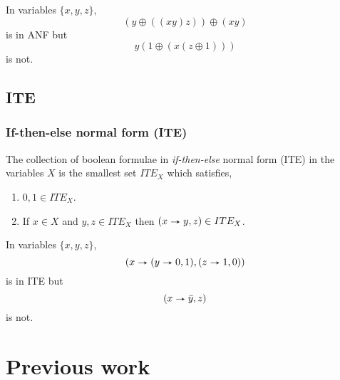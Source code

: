 \documentclass{beamer}
\newcommand{\ite}[3]{(#1 ~\tikz[baseline] \draw[->, -stealth] (0ex,.5ex)--(2ex,.5ex);~ #2 , #3)}
\begin{document}
\begin{frame}
\begin{example}
In variables $\{x,y,z\}$,
$$(y \oplus ((x y) z)) \oplus (x y)$$
is in ANF but 
$$y(1 \oplus (x(z \oplus 1)))$$
is not.
\end{example}
\end{frame}

\subsection[ITE]{ITE}
\begin{frame}
\frametitle{If-then-else normal form (ITE)}
The collection of boolean formulae in \textit{if-then-else} normal form (ITE) in the variables $X$ is the smallest set $ITE_X$ which satisfies,
\begin{enumerate}
\item $0,1 \in ITE_X$.
\item If $x \in X$ and $y,z \in ITE_X$ then $\ite{x}{y}{z} \in ITE_X$.
\end{enumerate}
\end{frame}

\begin{frame}
\begin{example}
In variables $\{x,y,z\}$,
$$\ite{x}{\ite{y}{0}{1}}{\ite{z}{1}{0}}$$
is in ITE but 
$$\ite{x}{\bar{y}}{z}$$
is not.
\end{example}
\end{frame}


\section[Previous work]{Previous work}
\end{document}
